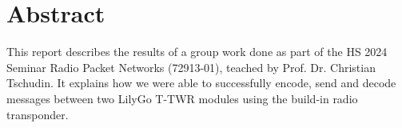 \chapter{Abstract}

This report describes the results of a group work done as part of the HS 2024 Seminar Radio Packet Networks (72913-01), teached by Prof. Dr. Christian Tschudin. It explains how we were able to successfully encode, send and decode messages between two LilyGo T-TWR modules using the build-in radio transponder.

